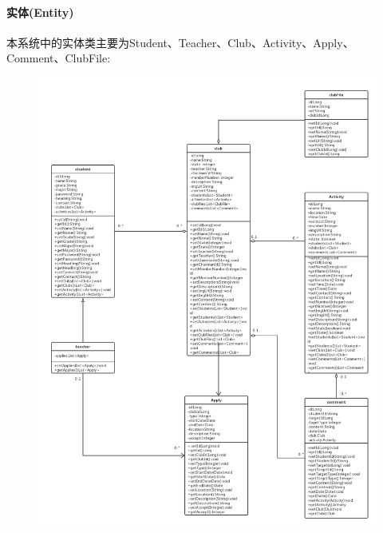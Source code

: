 \documentclass[UTF8]{ctexart}
\begin{document}
\paragraph{实体(Entity)}
本系统中的实体类主要为Student、Teacher、Club、Activity、Apply、Comment、ClubFile:
\begin{figure}[H]
\centering
\includegraphics[width = 1.0\textwidth]{xianhuo-class.png}
\end{figure}
\end{document}
